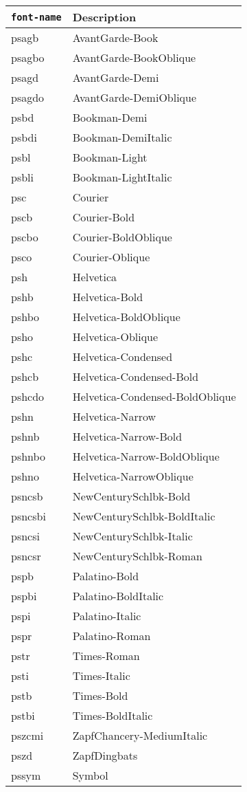 {\begin{tabular}{ll} \\ \hline
{\tt font-name} & Description \\ \hline 
psagb		&	AvantGarde-Book \\
psagbo		&	AvantGarde-BookOblique \\
psagd		&	AvantGarde-Demi \\
psagdo		&	AvantGarde-DemiOblique \\
psbd		&	Bookman-Demi \\
psbdi		&	Bookman-DemiItalic \\
psbl		&	Bookman-Light \\
psbli		&	Bookman-LightItalic \\
psc		&	Courier \\
pscb		&	Courier-Bold \\
pscbo		&	Courier-BoldOblique \\
psco		&	Courier-Oblique \\
psh		&	Helvetica \\
pshb		&	Helvetica-Bold \\
pshbo		&	Helvetica-BoldOblique \\
psho		&	Helvetica-Oblique \\
pshc		&	Helvetica-Condensed \\
pshcb		&	Helvetica-Condensed-Bold \\
pshcdo		&	Helvetica-Condensed-BoldOblique \\
pshn		&	Helvetica-Narrow \\
pshnb		&	Helvetica-Narrow-Bold \\
pshnbo		&	Helvetica-Narrow-BoldOblique \\
pshno		&	Helvetica-NarrowOblique \\
psncsb		&	NewCenturySchlbk-Bold \\
psncsbi		&	NewCenturySchlbk-BoldItalic \\
psncsi		&	NewCenturySchlbk-Italic \\
psncsr		&	NewCenturySchlbk-Roman \\
pspb		&	Palatino-Bold \\
pspbi		&	Palatino-BoldItalic \\
pspi		&	Palatino-Italic \\
pspr		&	Palatino-Roman \\
pstr		&	Times-Roman \\
psti		&	Times-Italic \\
pstb		&	Times-Bold \\
pstbi		&	Times-BoldItalic \\
pszcmi		&	ZapfChancery-MediumItalic \\
pszd		&	ZapfDingbats \\
pssym		&	Symbol \\
\hline
\end{tabular}
} %
